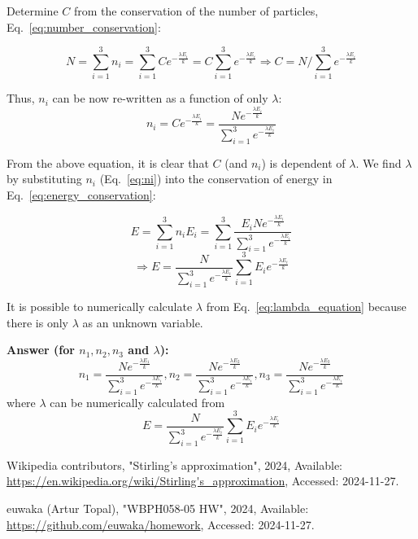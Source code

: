 \documentclass{article}
\begin{document}
Determine $C$ from the conservation of the number of particles, Eq.~\eqref{eq:number_conservation}:

\begin{equation*}
    N = \sum_{i=1}^{3}{n_i} = \sum_{i=1}^{3}{ Ce^{-\frac{\lambda E_i}{k}} } =  C \sum_{i=1}^{3}{ e^{-\frac{\lambda E_i}{k}} } \Rightarrow C = N / \sum_{i=1}^{3}{ e^{-\frac{\lambda E_i}{k}} }
\end{equation*}

Thus, $n_i$ can be now re-written as a function of only $\lambda$:
\begin{equation} \label{eq:ni}
  n_i = Ce^{-\frac{\lambda E_i}{k}} = \frac{N e^{-\frac{\lambda E_i}{k}}}{\sum_{i=1}^{3} e^{-\frac{\lambda E_i}{k}}}
\end{equation}

From the above equation, it is clear that $C$ (and $n_i$) is dependent of $\lambda$. We find $\lambda$ by substituting $n_i$ (Eq.~\eqref{eq:ni}) into the conservation of energy in Eq.~\eqref{eq:energy_conservation}:

\begin{equation*}
  E = \sum_{i=1}^{3}{n_iE_i} = \sum_{i=1}^{3}{\frac{E_i N e^{-\frac{\lambda E_i}{k}}}{\sum_{i=1}^{3} e^{-\frac{\lambda E_i}{k}}}}
\end{equation*}
\begin{equation} \label{eq:lambda_equation}
  \Rightarrow E = \frac{N}{\sum_{i=1}^{3} e^{-\frac{\lambda E_i}{k}}} \sum_{i=1}^{3}{ E_ie^{-\frac{\lambda E_i}{k}}}
\end{equation}

It is possible to numerically calculate $\lambda$ from Eq.~\eqref{eq:lambda_equation} because there is only $\lambda$ as an unknown variable.

\hfill \break

\textbf{Answer (for $n_1, n_2, n_3$ and $\lambda$):}
\begin{equation*}
  n_1 = \frac{N e^{-\frac{\lambda E_1}{k}}}{\sum_{i=1}^{3} e^{-\frac{\lambda E_i}{k}}},
  n_2 = \frac{N e^{-\frac{\lambda E_2}{k}}}{\sum_{i=1}^{3} e^{-\frac{\lambda E_i}{k}}},
  n_3 = \frac{N e^{-\frac{\lambda E_3}{k}}}{\sum_{i=1}^{3} e^{-\frac{\lambda E_i}{k}}}
\end{equation*} where $\lambda$ can be numerically calculated from
\begin{equation*}
E = \frac{N}{\sum_{i=1}^{3} e^{-\frac{\lambda E_i}{k}}} \sum_{i=1}^{3}{ E_ie^{-\frac{\lambda E_i}{k}}}
\end{equation*}


\begin{thebibliography}{99}

{Wikipedia contributors}, "{Stirling's approximation}", 2024, Available: \url{https://en.wikipedia.org/wiki/Stirling's_approximation}, Accessed: 2024-11-27.

{euwaka (Artur Topal)}, "WBPH058-05 HW", 2024, Available: \url{https://github.com/euwaka/homework}, Accessed: 2024-11-27.
  
\end{thebibliography}
\end{document}
